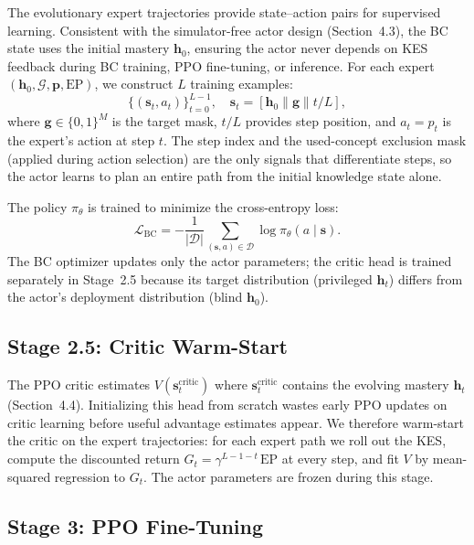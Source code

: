 \documentclass[sigconf,anonymous]{acmart}
\newcommand{\bc}{\mathrm{BC}}
\begin{document}
The evolutionary expert trajectories provide state--action pairs for supervised learning. Consistent with the simulator-free actor design (Section~4.3), the BC state uses the initial mastery $\mathbf{h}_0$, ensuring the actor never depends on KES feedback during BC training, PPO fine-tuning, or inference. For each expert $(\mathbf{h}_0, \mathcal{G}, \mathbf{p}, \text{EP})$, we construct $L$ training examples:
\begin{equation}
    \{(\mathbf{s}_t, a_t)\}_{t=0}^{L-1}, \quad \mathbf{s}_t = [\mathbf{h}_0 \| \mathbf{g} \| t/L],
\end{equation}
where $\mathbf{g} \in \{0,1\}^M$ is the target mask, $t/L$ provides step position, and $a_t = p_t$ is the expert's action at step $t$. The step index and the used-concept exclusion mask (applied during action selection) are the only signals that differentiate steps, so the actor learns to plan an entire path from the initial knowledge state alone.

The policy $\pi_\theta$ is trained to minimize the cross-entropy loss:
\begin{equation}
    \mathcal{L}_{\bc} = -\frac{1}{|\mathcal{D}|} \sum_{(\mathbf{s}, a) \in \mathcal{D}} \log \pi_\theta(a \mid \mathbf{s}).
\end{equation}
The BC optimizer updates only the actor parameters; the critic head is trained separately in Stage~2.5 because its target distribution (privileged $\mathbf{h}_t$) differs from the actor's deployment distribution (blind $\mathbf{h}_0$).

\subsection{Stage 2.5: Critic Warm-Start}
\label{sec:critic_ws}

The PPO critic estimates $V(\mathbf{s}_t^{\text{critic}})$ where $\mathbf{s}_t^{\text{critic}}$ contains the evolving mastery $\mathbf{h}_t$ (Section~4.4). Initializing this head from scratch wastes early PPO updates on critic learning before useful advantage estimates appear. We therefore warm-start the critic on the expert trajectories: for each expert path we roll out the KES, compute the discounted return $G_t = \gamma^{L-1-t}\,\text{EP}$ at every step, and fit $V$ by mean-squared regression to $G_t$. The actor parameters are frozen during this stage.

\subsection{Stage 3: PPO Fine-Tuning}
\end{document}
